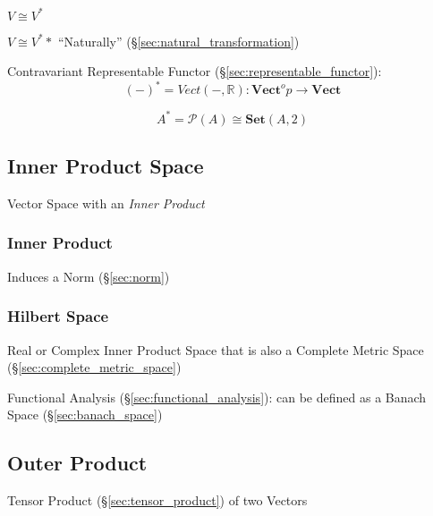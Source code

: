 $V \cong V^*$

$V \cong V^**$ ``Naturally'' (\S\ref{sec:natural_transformation})

Contravariant Representable Functor
(\S\ref{sec:representable_functor}):
\[
  (-)^* = Vect(-,\mathbb{R}) :
    \mathbf{Vect}^op \rightarrow \mathbf{Vect}
\]

\[
  A^* = \mathcal{P}(A) \cong \mathbf{Set}(A,2)
\]\cite{awodey06}



\subsection{Inner Product Space}\label{sec:innerproduct_space}

Vector Space with an \emph{Inner Product}



\subsubsection{Inner Product}\label{sec:inner_product}

Induces a Norm (\S\ref{sec:norm})



\subsubsection{Hilbert Space}\label{sec:hilbert_space}

Real or Complex Inner Product Space that is also a Complete Metric
Space (\S\ref{sec:complete_metric_space})

Functional Analysis (\S\ref{sec:functional_analysis}): can be defined
as a Banach Space (\S\ref{sec:banach_space})



\subsection{Outer Product}\label{sec:outer_product}

Tensor Product (\S\ref{sec:tensor_product}) of two Vectors



